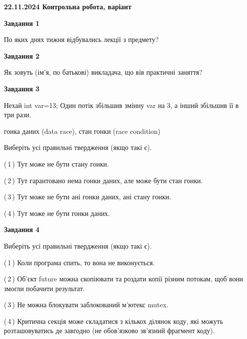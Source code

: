\documentclass[12pt, ukrainian]{article}
\begin{document}
\begin {large}

\textbf{22.11.2024 Контрольна робота, варіант  }\par


{

\begin{center}
\textbf{Завдання 1}
\end{center}

По яких днях тижня відбувались лекції з предмету?


\begin{center}
\textbf{Завдання 2}
\end{center}

Як зовуть (ім'я, по батькові) викладача, що вів практичні заняття?


\begin{center}
\textbf{Завдання 3}
\end{center}

Нехай int var=13; Один потік збільшив змінну var на 3, а інший збільшив її в три рази.

гонка даних (data race), стан гонки (race condition)

Виберіть усі правильні твердження (якщо такі є).\par
\vspace{2mm}
(\,1\,) Тут може не бути стану гонки.%

(\,2\,) Тут гарантовано нема гонки даних, але може бути стан гонки.%

(\,3\,) Тут може не бути ані гонки даних, ані стану гонки.%

(\,4\,) Тут може не бути гонки даних.%


\begin{center}
\textbf{Завдання 4}
\end{center}

Виберіть усі правильні твердження (якщо такі є).\par
\vspace{2mm}

(\,1\,) Коли програма спить, то вона не виконується.%

(\,2\,) Об’єкт future можна скопіювати та роздати копії різним потокам, щоб вони змогли побачити результат.%

(\,3\,) Не можна блокувати заблокований м’ютекс mutex.%

(\,4\,) Критична секція може складатися з кількох ділянок коду, які можуть розташовуватись де завгодно (не обов’язково зв’язний фрагмент коду).%


}
\end{large}
\end{document}
